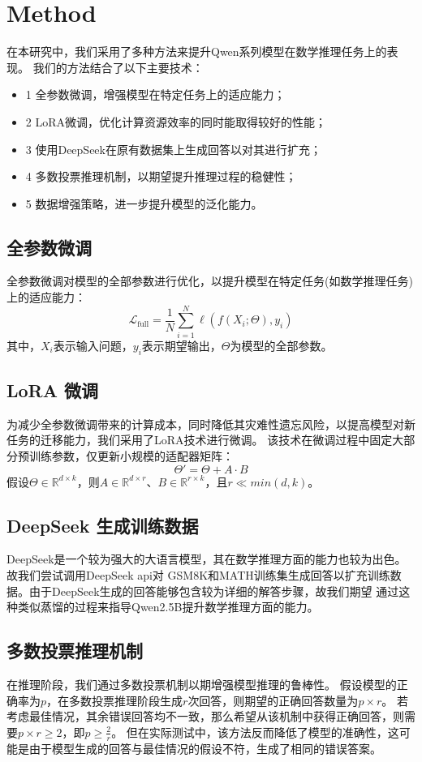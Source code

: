 \documentclass{article}
\begin{document}
\section{Method}


\par 在本研究中，我们采用了多种方法来提升Qwen系列模型在数学推理任务上的表现。
我们的方法结合了以下主要技术：
\begin{itemize}
    \item1 全参数微调，增强模型在特定任务上的适应能力；
    \item2 LoRA微调，优化计算资源效率的同时能取得较好的性能；
    \item3 使用DeepSeek在原有数据集上生成回答以对其进行扩充；
    \item4 多数投票推理机制，以期望提升推理过程的稳健性；
    \item5 数据增强策略，进一步提升模型的泛化能力。
\end{itemize}
 
\subsection{全参数微调}
全参数微调对模型的全部参数进行优化，以提升模型在特定任务(如数学推理任务)上的适应能力：
$$
\mathcal{L}_{\text{full}} = \frac{1}{N} \sum_{i=1}^N \ell(f(X_i; \Theta), y_i)
$$
其中，$X_i$表示输入问题，$y_i$表示期望输出，$\Theta$为模型的全部参数。

\subsection{LoRA 微调}
为减少全参数微调带来的计算成本，同时降低其灾难性遗忘风险，以提高模型对新任务的迁移能力，我们采用了LoRA技术进行微调。
该技术在微调过程中固定大部分预训练参数，仅更新小规模的适配器矩阵：
$$
\Theta' = \Theta + A \cdot B
$$
假设$\Theta \in \mathbb{R}^{d \times k}$，则$A \in \mathbb{R}^{d \times r}$、$B \in \mathbb{R}^{r \times k}$，且$r \ll min(d, k)$。

\subsection{DeepSeek 生成训练数据}
DeepSeek是一个较为强大的大语言模型，其在数学推理方面的能力也较为出色。故我们尝试调用DeepSeek api对
GSM8K和MATH训练集生成回答以扩充训练数据。由于DeepSeek生成的回答能够包含较为详细的解答步骤，故我们期望
通过这种类似蒸馏的过程来指导Qwen2.5B提升数学推理方面的能力。

\subsection{多数投票推理机制}
在推理阶段，我们通过多数投票机制以期增强模型推理的鲁棒性。
假设模型的正确率为$p$，在多数投票推理阶段生成$r$次回答，则期望的正确回答数量为$p \times r$。
若考虑最佳情况，其余错误回答均不一致，那么希望从该机制中获得正确回答，则需要$p \times r \ge 2$，即$p \ge \frac{2}{r}$。
但在实际测试中，该方法反而降低了模型的准确性，这可能是由于模型生成的回答与最佳情况的假设不符，生成了相同的错误答案。
\end{document}
